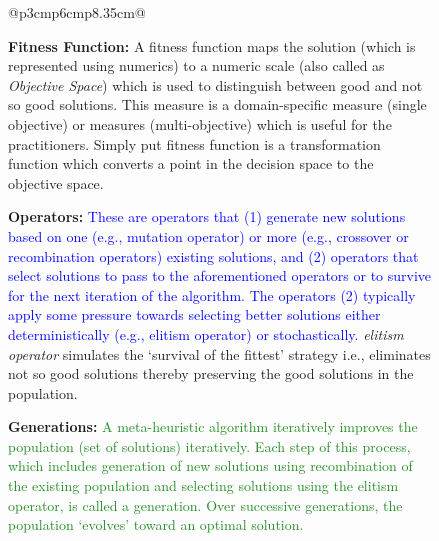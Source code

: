 \documentclass[sigconf,anonymous,review]{acmart}
\newcommand\TODO[1]{\textcolor{ScarletRed}{\textbf{\colorbox{yellow}{\small TODO:}} \emph{#1}}\xspace}
\newcommand\llm[1]{\textcolor{blue}{#1\xspace}}
\newcommand\vivek[1]{\textcolor{ForestGreen}{#1\xspace}}
\begin{document}
\begin{figure}
{\begin{tabular}{@{}p{3cm}p{6cm}p{8.35cm}@{}}
{\begin{minipage}[b]{\linewidth}
\noindent\textbf{Fitness Function: } A fitness function maps the solution (which is represented using numerics) to a numeric scale (also called as \textit{Objective Space}) which is used to distinguish between good and not so good solutions. This measure is a domain-specific measure (single objective) or measures (multi-objective) which is useful for the practitioners.
Simply put fitness function is a transformation function which converts a point in the decision space to the objective space. 

\noindent\textbf{Operators: } \llm{These are operators that (1) generate new solutions based on one (e.g., mutation operator) or more (e.g., crossover or recombination operators) existing solutions, and (2) operators that select solutions to pass to the aforementioned operators or to survive for the next iteration of the algorithm. The operators (2) typically apply some pressure towards selecting better solutions either deterministically (e.g., elitism operator) or stochastically.} 
\textit{elitism operator} simulates the `survival of the fittest' strategy i.e., eliminates not so good solutions thereby preserving the good solutions in the population. 

\noindent\textbf{Generations: } \vivek{A meta-heuristic algorithm iteratively improves the population (set of solutions) iteratively. Each step of this process, which includes generation of new solutions using recombination of the existing population and selecting solutions using the elitism operator, is called a generation.  Over successive generations, the population `evolves' toward an optimal solution.}
\end{minipage}\hspace{0.1cm}
}
 \\
 \\ 
{}
\end{tabular}}
\end{figure}
\end{document}

